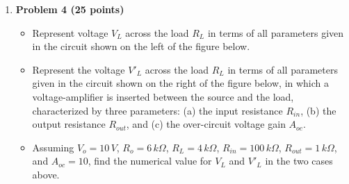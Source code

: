 \begin{enumerate}
\begin{comment}
\htmladdimg{../midterm3a.gif}

The circuit shown below is a silicon transistor amplifier which takes one
input and generates two outputs. Assume $V_{CC}=20V$, $R_1=20K\Omega$,
$R_2=10K\Omega$, $R_C=R_E=500\Omega$, $\beta=100$. 

\begin{itemize}
\item Find $V_B$, $I_B$, $V_E$ and $V_C$, and the DC operating point in 
terms of $I_C$ and $V_{CE}$. 
\item In the figure provided, draw the load line, indicate the DC operating 
point, and find the corresponding $I_C$ and $V_{CE}$.
\item If the input voltage is such that it produces an AC component of the 
base current:
\[	i_b(t)=0.1 cos(\omega t) \; mA	\]
give the expression of the AC component of the two output voltages $v_1(t)$ 
at the emitter and $v_2(t)$ at the collector, and sketch their waveforms in 
the SAME plot provided below, where $v_{in}(t)=cos(\omega t)$ is also ploted.
(No need to be to the scale vertically, but do pay attention to the time
scale.)
\end{itemize}

\htmladdimg{../midterm3b.gif}
\htmladdimg{../midterm3c.gif}


\end{comment}

\item {\bf Problem 4 (25 points)} 
  \begin{itemize}
  \item Represent voltage $V_L$ across the load $R_L$ in terms of all
    parameters given in the circuit shown on the left of the figure below.
  \item Represent the voltage $V'_L$ across the load $R_L$ in terms of all
    parameters given in the circuit shown on the right of the figure below,
    in which a voltage-amplifier is inserted between the source and the load, 
    characterized by three parameters: (a) the input resistance $R_{in}$, (b)
    the output resistance $R_{out}$, and (c) the over-circuit voltage gain 
    $A_{oc}$. 
  \item Assuming $V_o=10\,V$, $R_o=6\,k\Omega$, $R_L=4\,k\Omega$, 
    $R_{in}=100\,k\Omega$, $R_{out}=1\,k\Omega$, and $A_{oc}=10$, find the 
    numerical value for $V_L$ and $V'_L$ in the two cases above.
  \end{itemize}


\end{enumerate}
